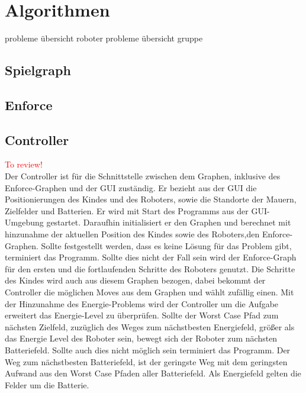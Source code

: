 \section{Algorithmen}
probleme übersicht roboter
probleme übersicht gruppe
\subsection{Spielgraph}
\subsection{Enforce}
\subsection{Controller}\textcolor{red}{To review!}\\
Der Controller ist für die Schnittstelle zwischen dem Graphen, inklusive des Enforce-Graphen und der GUI zuständig. Er bezieht aus der GUI die Positionierungen des Kindes und des Roboters, sowie die Standorte der Mauern, Zielfelder und Batterien. Er wird mit Start des Programms aus der GUI-Umgebung gestartet. Daraufhin initialisiert er den Graphen und berechnet mit hinzunahme der aktuellen Position des Kindes sowie des Roboters,den Enforce-Graphen. Sollte festgestellt werden, dass es keine Lösung für das Problem gibt, terminiert das Programm. Sollte dies nicht der Fall sein wird der Enforce-Graph für den ersten und die fortlaufenden Schritte des Roboters genutzt. Die Schritte des Kindes wird auch aus diesem Graphen bezogen, dabei bekommt der Controller die möglichen Moves aus dem Graphen und wählt zufällig einen. Mit der Hinzunahme des Energie-Problems wird der Controller um die Aufgabe erweitert das Energie-Level zu überprüfen. Sollte der Worst Case Pfad zum nächsten Zielfeld, zuzüglich des Weges zum nächstbesten Energiefeld, größer als das Energie Level des Roboter sein, bewegt sich der Roboter zum nächsten Batteriefeld. Sollte auch dies nicht möglich sein terminiert das Programm. Der Weg zum nächstbesten Batteriefeld, ist der geringste Weg mit dem geringsten Aufwand aus den Worst Case Pfaden aller Batteriefeld. Als Energiefeld gelten die Felder um die Batterie.


%
